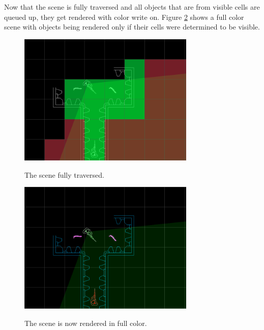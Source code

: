 \documentclass[12pt]{ucthesis}
\newcommand{\captionfonts}{\small\bf\ssp}
\begin{document}
Now that the scene is fully traversed and all objects that are from visible cells are queued up, they get rendered with color write on.
Figure \ref{fig:algorithm-03} shows a full color scene with objects being rendered only if their cells were determined to be visible.

\begin{figure}
\begin{center}
\includegraphics[width=0.75\textwidth]{Images/sceneAlgorithm/02.png}
\captionfonts
\caption[Traversed Camera View]{The scene fully traversed.}
\label{fig:algorithm-02}
\end{center}
\end{figure}

\begin{figure}
\begin{center}
\includegraphics[width=0.75\textwidth]{Images/sceneAlgorithm/03.png}
\captionfonts
\caption[Rendered Scene]{The scene is now rendered in full color.}
\label{fig:algorithm-03}
\end{center}
\end{figure}
\end{document}
